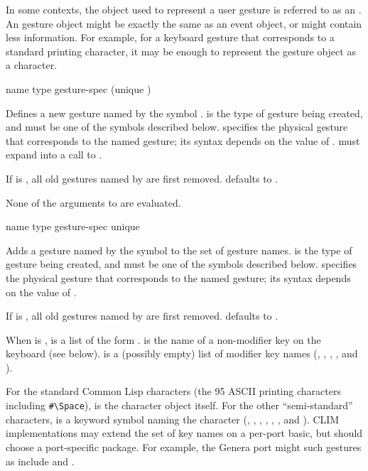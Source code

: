 In some contexts, the object used to represent a user gesture is referred to as
an .  An gesture object might be exactly the same as an
event object, or might contain less information.  For example, for a keyboard
gesture that corresponds to a standard printing character, it may be enough to
represent the gesture object as a character.


 {name type gesture-spec \key (unique )} 

Defines a new gesture named by the symbol .   is the type of
gesture being created, and must be one of the symbols described below.
 specifies the physical gesture that corresponds to the named
gesture; its syntax depends on the value of .
 must expand into a call to .

If  is , all old gestures named by  are first
removed.   defaults to .

None of the arguments to  are evaluated.

 {name type gesture-spec \key unique}

Adds a gesture named by the symbol  to the set of gesture names.
 is the type of gesture being created, and must be one of the symbols
described below.   specifies the physical gesture that
corresponds to the named gesture; its syntax depends on the value of .

If  is , all old gestures named by  are first
removed.   defaults to .

When  is ,  is a list of the form
.   is the name of a
non-modifier key on the keyboard (see below).   is a
(possibly empty) list of modifier key names (, ,
, , and ).

For the standard Common Lisp characters (the 95 ASCII printing characters
including \verb+#\Space+),  is the character object itself.  For
the other ``semi-standard'' characters,  is a keyword symbol
naming the character (, , , ,
, , and ).  CLIM implementations may extend
the set of key names on a per-port basic, but should choose a port-specific
package.  For example, the Genera port might such gestures as include
 and .

